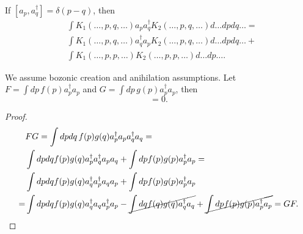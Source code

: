 \documentclass[main.tex]{subfiles}
\begin{document}
\begin{lemma}
If $[a_p, a^\dagger_q] = \delta(p - q)$, then
\begin{align*}
&\int K_1(\dots, p, q, \dots) a_p a^\dagger_q K_2(\dots, p, q, \dots) d \dots dpdq \ldots = \\
&\int K_1(\dots, p, q, \dots) a^\dagger_q a_p K_2(\dots, p, q, \dots) d \dots dpdq \ldots + \\ 
&\int K_1(\dots, p, p, \dots)K_2(\dots, p,p, \dots)d \dots dp \dots.
\end{align*}
\end{lemma}

\begin{proposition} We assume bozonic creation and anihilation assumptions.
Let $F = \int dp\, f(p)a^\dagger_p a_p$ and $G = \int dp\, g(p)a^\dagger_p a_p$, then
\begin{equation}
[F, G] = 0.
\end{equation} 
\end{proposition}
\begin{proof}
\begin{align*}
&FG = \int dp dq \,f(p)g(q) a^\dagger_p a_p a^\dagger_q a_q = \\
& \int dp dq f(p)g(q) a^\dagger_p  a^\dagger_q a_p a_q + \int dp f(p)g(p) a^\dagger_p a_p =  \\
& \int dp dq f(p)g(q) a^\dagger_q a^\dagger_p  a_q  a_p  + \int dp f(p)g(p) a^\dagger_p a_p \\ =
& \int dp dq f(p)g(q) a^\dagger_q a_q a^\dagger_p   a_p - \cancel{\int dq f(q)g(q) a^\dagger_q    a_q}  + \cancel{\int dp f(p)g(p) a^\dagger_p a_p} 
= GF. \\ 
\end{align*}
\end{proof}
\end{document}
